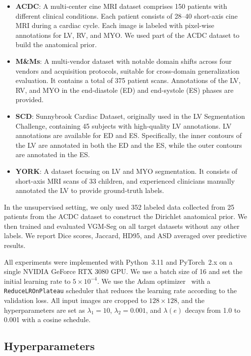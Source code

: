 \documentclass[preprint,12pt]{elsarticle}
\begin{document}
\begin{itemize}
  \item \textbf{ACDC}: A multi-center cine MRI dataset comprises 150 patients with different clinical conditions. Each patient consists of 28–40 short-axis cine MRI during a cardiac cycle. Each image is labeled with pixel-wise annotations for LV, RV, and MYO. 
  We used part of the ACDC dataset to build the anatomical prior.
  \item \textbf{M\&Ms}: A multi-vendor dataset with notable domain shifts across four vendors and acquisition protocols, suitable for cross-domain generalization evaluation. 
It contains a total of 375 patient scans.
Annotations of the LV, RV, and MYO in the end-diastole (ED) and end-systole (ES) phases are provided.
  
 \item \textbf{SCD}: Sunnybrook Cardiac Dataset, originally used in the LV Segmentation Challenge, containing 45 subjects with high-quality LV annotations.
 LV annotations are available for ED and ES. Specifically, the inner contours of the LV are annotated in both the ED and the ES, while the outer contours are annotated in the ES.
  
  \item \textbf{YORK}: A dataset focusing on LV and MYO segmentation. It consists of short-axis MRI scans of 33 children, and experienced clinicians manually annotated the LV to provide ground-truth labels.
\end{itemize}

In the unsupervised setting, we only used 352 labeled data collected from 25 patients from the ACDC dataset to construct the Dirichlet anatomical prior. We then trained and evaluated VGM-Seg on all target datasets without any other labels. We report Dice scores, Jaccard, HD95, and ASD averaged over predictive results.


All experiments were implemented with Python~3.11 and PyTorch~2.x on a single NVIDIA GeForce RTX 3080 GPU. We use a batch size of 16 and set the initial learning rate to $5\times 10^{-4}$. We use the Adam optimizer~\cite{adam} with a \texttt{ReduceLROnPlateau} scheduler that reduces the learning rate according to the validation loss. All input images are cropped to $128\times 128$, and the hyperparameters are set as $\lambda_1=10$, $\lambda_2=0.001$, and $\lambda(e)$ decays from 1.0 to 0.001 with a cosine schedule.



\subsection{Hyperparameters}
\end{document}
